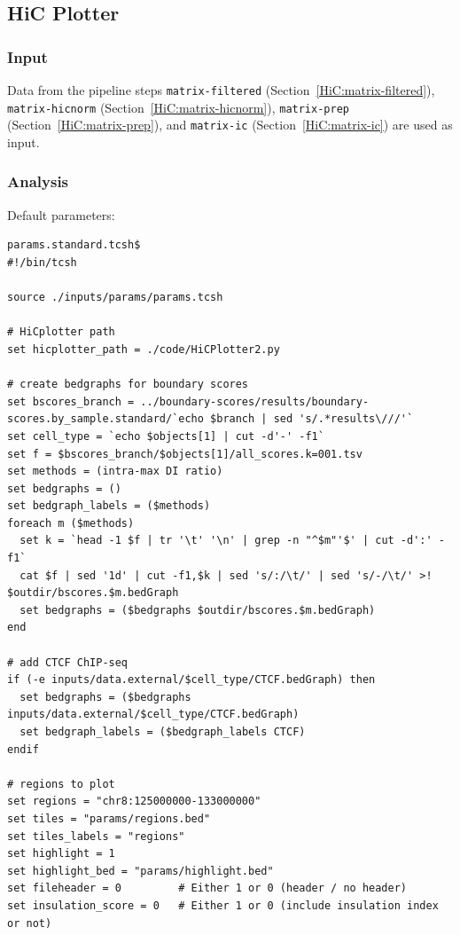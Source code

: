 \subsection{HiC Plotter}\label{HiC:hicplotter}%
\subsubsection{Input} %
Data from the pipeline steps %
\texttt{matrix-filtered} (Section~\ref{HiC:matrix-filtered}), \texttt{matrix-hicnorm} (Section~\ref{HiC:matrix-hicnorm}), \texttt{matrix-prep} (Section~\ref{HiC:matrix-prep}), and \texttt{matrix-ic} (Section~\ref{HiC:matrix-ic}) are used as input.
\subsubsection{Analysis} %
Default parameters:
\begin{lstlisting}
params.standard.tcsh$
#!/bin/tcsh

source ./inputs/params/params.tcsh

# HiCplotter path
set hicplotter_path = ./code/HiCPlotter2.py

# create bedgraphs for boundary scores
set bscores_branch = ../boundary-scores/results/boundary-scores.by_sample.standard/`echo $branch | sed 's/.*results\///'`
set cell_type = `echo $objects[1] | cut -d'-' -f1`
set f = $bscores_branch/$objects[1]/all_scores.k=001.tsv
set methods = (intra-max DI ratio)
set bedgraphs = ()
set bedgraph_labels = ($methods)
foreach m ($methods)
  set k = `head -1 $f | tr '\t' '\n' | grep -n "^$m"'$' | cut -d':' -f1`
  cat $f | sed '1d' | cut -f1,$k | sed 's/:/\t/' | sed 's/-/\t/' >! $outdir/bscores.$m.bedGraph
  set bedgraphs = ($bedgraphs $outdir/bscores.$m.bedGraph)
end

# add CTCF ChIP-seq
if (-e inputs/data.external/$cell_type/CTCF.bedGraph) then
  set bedgraphs = ($bedgraphs inputs/data.external/$cell_type/CTCF.bedGraph)
  set bedgraph_labels = ($bedgraph_labels CTCF)
endif

# regions to plot
set regions = "chr8:125000000-133000000"
set tiles = "params/regions.bed"
set tiles_labels = "regions"
set highlight = 1
set highlight_bed = "params/highlight.bed"
set fileheader = 0         # Either 1 or 0 (header / no header)
set insulation_score = 0   # Either 1 or 0 (include insulation index or not)
\end{lstlisting}
